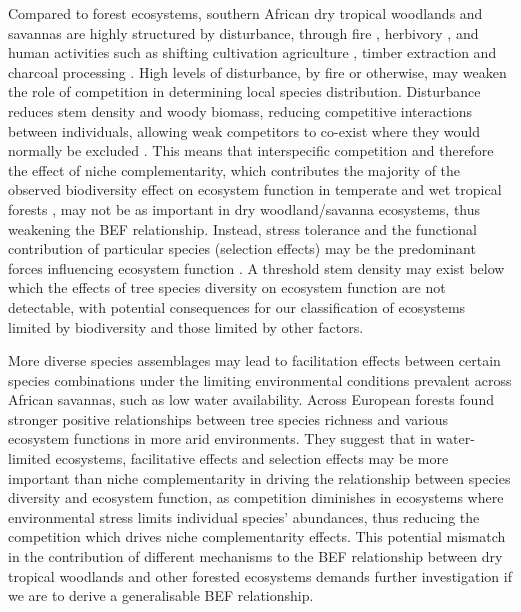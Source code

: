 \documentclass[11pt,a4paper]{article}
\begin{document}
Compared to forest ecosystems, southern African dry tropical woodlands and savannas are highly structured by disturbance, through fire \citep{Lehmann2014}, herbivory \citep{Sankaran2008, Levick2009}, and human activities such as shifting cultivation agriculture \citep{Heinimann2017}, timber extraction and charcoal processing \citep{Dewees2010, McNicol2018b}. High levels of disturbance, by fire or otherwise, may weaken the role of competition in determining local species distribution. Disturbance reduces stem density and woody biomass, reducing competitive interactions between individuals, allowing weak competitors to co-exist where they would normally be excluded \citep{Grime1979, Grace1990}. This means that interspecific competition and therefore the effect of niche complementarity, which contributes the majority of the observed biodiversity effect on ecosystem function in temperate and wet tropical forests \citep{Wright2017, Poorter2015, Sande2017a}, may not be as important in dry woodland/savanna ecosystems, thus weakening the BEF relationship. Instead, stress tolerance and the functional contribution of particular species (selection effects) may be the predominant forces influencing ecosystem function \citep{Lasky2014, Tobner2016}. A threshold stem density may exist below which the effects of tree species diversity on ecosystem function are not detectable, with potential consequences for our classification of ecosystems limited by biodiversity and those limited by other factors.

More diverse species assemblages may lead to facilitation effects between certain species combinations under the limiting environmental conditions prevalent across African savannas, such as low water availability. Across European forests \citet{Ratcliffe2017} found stronger positive relationships between tree species richness and various ecosystem functions in more arid environments. They suggest that in water-limited ecosystems, facilitative effects and selection effects may be more important than niche complementarity in driving the relationship between species diversity and ecosystem function, as competition diminishes in ecosystems where environmental stress limits individual species' abundances, thus reducing the competition which drives niche complementarity effects. This potential mismatch in the contribution of different mechanisms to the BEF relationship between dry tropical woodlands and other forested ecosystems demands further investigation if we are to derive a generalisable BEF relationship.
\end{document}
